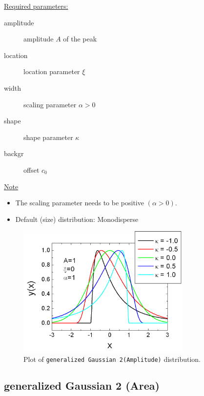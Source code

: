 \underline{Required parameters:}
\begin{description}
    \item[amplitude] amplitude $A$ of the peak
    \item[location] location parameter $\xi$
    \item[width] scaling parameter $\alpha > 0$
    \item[shape] shape parameter $\kappa$
    \item[backgr] offset $c_0$
\end{description}


\underline{Note}
\begin{itemize}
  \item The scaling parameter needs to be positive $(\alpha > 0)$.
  \item Default (size) distribution: Monodisperse
\end{itemize}

\begin{figure}[htb]
\begin{center}
\includegraphics[width=0.768\textwidth]{generalizedGaussian2Amplitude.png}
\end{center}
\caption{Plot of \texttt{generalized Gaussian 2(Amplitude)}
distribution.} \label{fig:generalizedGaussian2Amplitude}
\end{figure}

\clearpage
\subsection{generalized Gaussian 2 (Area)} ~\\
\label{sec:generalizedGaussian2Area}

